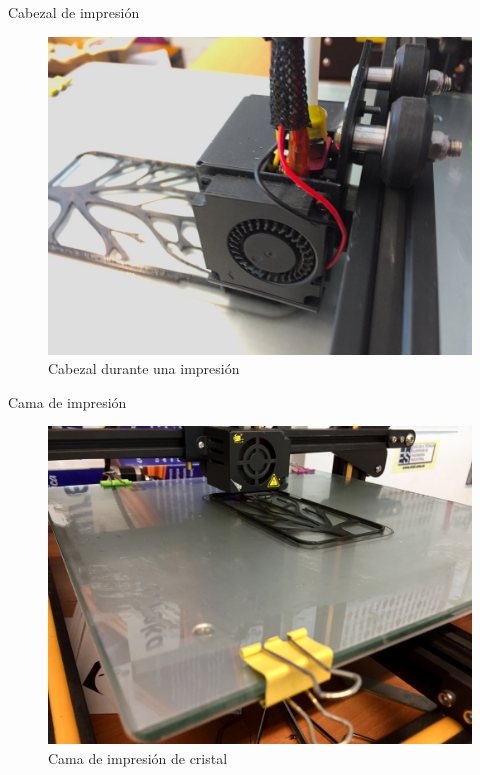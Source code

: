 \documentclass{beamer}
\begin{document}
	\begin{frame}{Cabezal de impresión}
		\begin{figure}
			\includegraphics[height=0.8\textheight]{images/cabezal}
			\caption{Cabezal durante una impresión}
		\end{figure}
	\end{frame}
	\begin{frame}{Cama de impresión}
		\begin{figure}
			\includegraphics[height=0.8\textheight]{images/cama}
			\caption{Cama de impresión de cristal}
		\end{figure}
	\end{frame}
\end{document}

